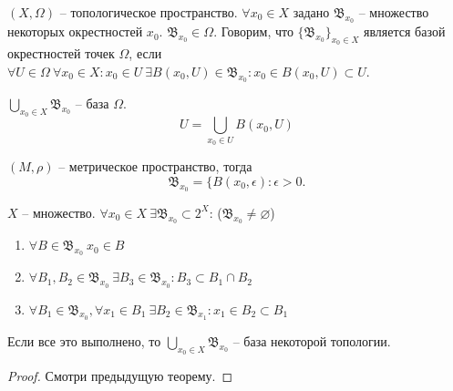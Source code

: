 \documentclass[main]{subfiles}
\begin{document}
\begin{definition}
    $(X, \Omega)$ -- топологическое пространство.
    $\forall x_0 \in X$ задано $\mathfrak{B}_{x_0}$ -- множество некоторых окрестностей $x_0$.
    $\mathfrak{B}_{x_0} \in \Omega$.
    Говорим, что $\{\mathfrak{B}_{x_0}\}_{x_0 \in X}$ является базой окрестностей точек $\Omega$,
    если $\forall U \in \Omega\ \forall x_0 \in X: x_0 \in U\ \exists B(x_0, U) \in \mathfrak{B}_{x_0}:
        x_0 \in B(x_0, U) \subset U$.
\end{definition}
\begin{remark}
    $\bigcup_{x_0 \in X} \mathfrak{B}_{x_0}$ -- база $\Omega$.
    \[U = \bigcup_{x_0 \in U} B(x_0, U)\]
\end{remark}
\begin{example}
    $(M, \rho)$ -- метрическое пространство, тогда \[\mathfrak{B}_{x_0} = \{B(x_0, \epsilon) : \epsilon > 0.\]
\end{example}

\begin{theorem}
    $X$ -- множество. $\forall x_0 \in X\ \exists \mathfrak{B}_{x_0} \subset 2^X$: ($\mathfrak{B}_{x_0} \neq \varnothing$)
    \begin{enumerate}
        \item $\forall B \in \mathfrak{B}_{x_0}\ x_0 \in B$
        \item $\forall B_1, B_2 \in \mathfrak{B}_{x_0}\ \exists B_3 \in \mathfrak{B}_{x_0}: B_3 \subset B_1 \cap B_2$
        \item $\forall B_1 \in \mathfrak{B}_{x_0}, \forall x_1 \in B_1\ \exists B_2 \in \mathfrak{B}_{x_1}: x_1 \in B_2 \subset B_1$
    \end{enumerate}
    Если все это выполнено, то $\bigcup_{x_0 \in X} \mathfrak{B}_{x_0}$ -- база некоторой топологии.
\end{theorem}
\begin{proof}
    Смотри предыдущую теорему.
\end{proof}
\end{document}
